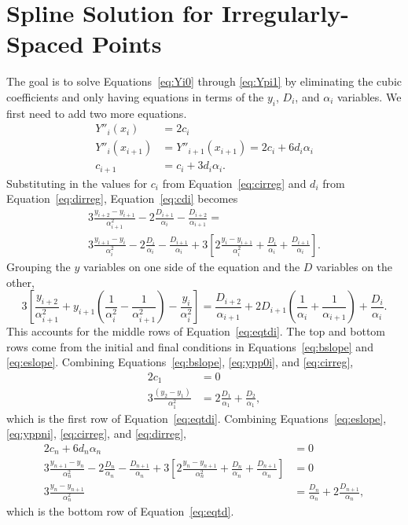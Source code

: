 \documentclass{scrartcl}
\begin{document}
\section{Spline Solution for Irregularly-Spaced Points}\label{sec:irreg-deriv}
The goal is to solve Equations~\ref{eq:Yi0} through \ref{eq:Ypi1}
by eliminating the cubic coefficients and only having equations
in terms of the $y_i$, $D_i$, and $\alpha_i$ variables.
We first need to add two more equations.
\begin{align}
Y''_i(x_i) &= 2c_i\label{eq:ypp0i}\\
Y''_i(x_{i+1}) &= Y''_{i+1}(x_{i+1})
 = 2c_i+6d_i\alpha_i\label{eq:yppni}\\
c_{i+1} &= c_i + 3d_i \alpha_i. \label{eq:cdi}
\end{align}
Substituting in the values for $c_i$ from Equation~\ref{eq:cirreg} and
$d_i$ from Equation~\ref{eq:dirreg}, Equation~\ref{eq:cdi} becomes
\begin{multline}
3\frac{y_{i+2}-y_{i+1}}{\alpha_{i+1}^2}-2\frac{D_{i+1}}{\alpha_i}
	-\frac{D_{i+2}}{\alpha_{i+1}} = \\
	3\frac{y_{i+1}-y_i}{\alpha_i^2}-2\frac{D_i}{\alpha_i}
	-\frac{D_{i+1}}{\alpha_i}
	+3\left[2\frac{y_i-y_{i+1}}{\alpha_i^2}+\frac{D_i}{\alpha_i}
	+\frac{D_{i+1}}{\alpha_i}\right].
\end{multline}
Grouping the $y$ variables on one side of the equation and the $D$
variables on the other,
\begin{equation}
3\left[\frac{y_{i+2}}{\alpha_{i+1}^2}+y_{i+1}\left(\frac{1}{\alpha_i^2}
	-\frac{1}{\alpha_{i+1}^2}\right)-\frac{y_i}{\alpha_i^2}\right]
	= \frac{D_{i+2}}{\alpha_{i+1}}
		+2D_{i+1}\left(\frac{1}{\alpha_i}+\frac{1}{\alpha_{i+1}}\right)
		+\frac{D_i}{\alpha_i}.
\end{equation}
This accounts for the middle rows of Equation~\ref{eq:eqtdi}. The
top and bottom rows come from the initial and final conditions
in Equations~\ref{eq:bslope} and \ref{eq:eslope}. Combining
Equations~\ref{eq:bslope}, \ref{eq:ypp0i}, and \ref{eq:cirreg},
\begin{align}
2c_1 & = 0\\
3\frac{(y_2-y_1)}{\alpha_1^2} &= 2\frac{D_1}{\alpha_1} + \frac{D_2}{\alpha_1},
\end{align}
which is the first row of Equation~\ref{eq:eqtdi}. Combining
Equations~\ref{eq:eslope}, \ref{eq:yppni}, \ref{eq:cirreg}, and
\ref{eq:dirreg},
\begin{align}
2c_n+6d_n\alpha_n &= 0\\
3\frac{y_{n+1}-y_n}{\alpha_n^2}-2\frac{D_n}{\alpha_n}
	-\frac{D_{n+1}}{\alpha_n}
	+3\left[2\frac{y_n-y_{n+1}}{\alpha_n^2}+\frac{D_n}{\alpha_n}
	+\frac{D_{n+1}}{\alpha_n}\right] &= 0\\
3\frac{y_n-y_{n+1}}{\alpha_n^2} &= \frac{D_n}{\alpha_n}
	+2\frac{D_{n+1}}{\alpha_n},
\end{align}
which is the bottom row of Equation~\ref{eq:eqtd}.
\end{document}
